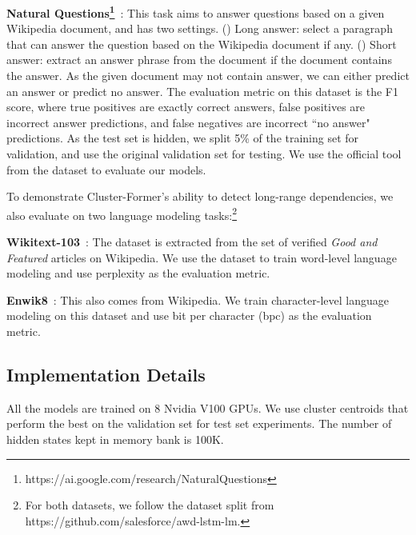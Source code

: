 \documentclass[11pt,a4paper]{article}
\begin{document}
\vspace{5pt}
\noindent \textbf{Natural Questions\footnote{https://ai.google.com/research/NaturalQuestions}}~\cite{kwiatkowski2019natural}: This task aims to answer questions based on a given Wikipedia document, and has two settings.
() Long answer: select a paragraph that can answer the question based on the Wikipedia document if any.
() Short answer: extract an answer phrase from the document if the document contains the answer.
As the given document may not contain answer, we can either predict an answer or predict no answer. 
The evaluation metric on this dataset is the F1 score, where
true positives are exactly correct answers, false positives are incorrect answer predictions, and false negatives are incorrect ``no answer" predictions.
As the test set is hidden, we split 5\% of the training set for validation, and use the original validation set for testing.
We use the official tool from the dataset to evaluate our models.

To demonstrate Cluster-Former's ability to detect long-range dependencies, we also evaluate on two language modeling tasks:\footnote{For both datasets, we follow the dataset split from https://github.com/salesforce/awd-lstm-lm.}

\vspace{5pt}
\noindent \textbf{Wikitext-103}~\cite{merity2016pointer}: The dataset is extracted from the set of verified \emph{Good and Featured} articles on Wikipedia. We use the dataset to train word-level language modeling and use perplexity as the evaluation metric.

\vspace{5pt}
\noindent \textbf{Enwik8}~\cite{mahoney2011large}: This also comes from Wikipedia. We train character-level language modeling on this dataset and use bit per character (bpc) as the evaluation metric.

\subsection{Implementation Details}
All the models are trained on 8 Nvidia V100 GPUs. 
We use cluster centroids that perform the best on the validation set for test set experiments.
The number of hidden states kept in memory bank is 100K.
\end{document}
